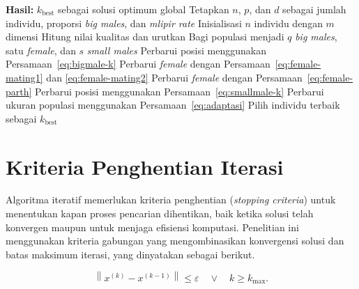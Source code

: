     \begin{algorithm}[H]
        \caption{\textit{Komodo Mlipir Algorithm}}
        \label{alg:kma}
        \begin{algorithmic}[1]
        \State \textbf{Hasil:} $k_{\text{best}}$ sebagai solusi optimum global
        \State Tetapkan $n$, $p$, dan $d$ sebagai jumlah individu, proporsi
        \textit{big males}, dan \textit{mlipir rate}
        \State Inisialisasi $n$ individu dengan $m$ dimensi
                \State Hitung nilai kualitas dan urutkan
            \EndFor
            \State Bagi populasi menjadi $q$ \textit{big males}, satu
            \textit{female}, dan $s$ \textit{small males}
                \State Perbarui posisi menggunakan Persamaan~\ref{eq:bigmale-k}
            \EndFor
                \State Perbarui \textit{female} dengan Persamaan~\ref{eq:female-mating1}
                dan \ref{eq:female-mating2}
            \Else
                \State Perbarui \textit{female} dengan Persamaan~\ref{eq:female-parth}
            \EndIf
                \State Perbarui posisi menggunakan Persamaan~\ref{eq:smallmale-k}
            \EndFor
            \State Perbarui ukuran populasi menggunakan Persamaan~\ref{eq:adaptasi}
            \State Pilih individu terbaik sebagai $k_{\text{best}}$
        \EndWhile
        \end{algorithmic}   
    \end{algorithm}


\section{Kriteria Penghentian Iterasi}\label{sec:stopping}

Algoritma iteratif memerlukan kriteria penghentian (\textit{stopping criteria}) untuk menentukan kapan proses pencarian dihentikan, baik ketika solusi telah konvergen maupun untuk menjaga efisiensi komputasi. Penelitian ini menggunakan kriteria gabungan yang mengombinasikan konvergensi solusi dan batas maksimum iterasi, yang dinyatakan sebagai berikut.

\begin{equation}
    \label{eq:stopping}
    \left\lVert x^{(k)} - x^{(k-1)} \right\rVert \leq \varepsilon
    \quad \vee \quad k \geq k_{\max}.
\end{equation}

